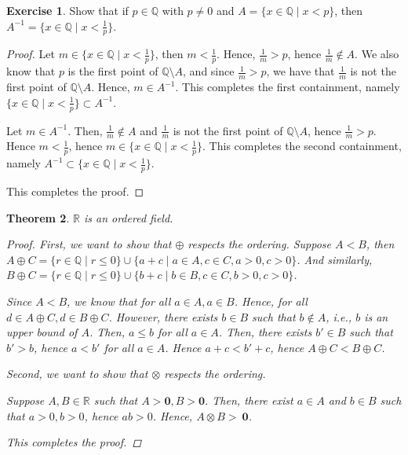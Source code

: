 \documentclass[11pt]{article}
\newcommand{\bbQ}{\mathbb{Q}}
\newcommand{\bbR}{\mathbb{R}}
\newtheorem{theorem}{Theorem}[section]
\theoremstyle{definition}
\newtheorem{exercise}[theorem]{Exercise}
\numberwithin{equation}{subsection}
\begin{document}
\begin{exercise}
	Show that if $p \in \bbQ$ with $p \neq 0$ and $A= \{x \in \bbQ \mid x < p\}$, then $A^{-1} = \{x \in \bbQ \mid x < \frac{1}{p}\}$.
        
\begin{proof}
Let $m \in \{x \in \bbQ \mid x < \frac{1}{p}\}$, then $m<\frac{1}{p}$. Hence, $\frac{1}{m}>p$, hence $\frac{1}{m} \notin A$. We also know that $p$ is the first point of $\bbQ \setminus A$, and since $\frac{1}{m}>p$, we have that $\frac{1}{m}$ is not the first point of $\bbQ \setminus A$. Hence, $m \in A^{-1}$. This completes the first containment, namely $\{x \in \bbQ \mid x < \frac{1}{p}\} \subset A^{-1}$.

Let $m \in A^{-1}$. Then, $\frac{1}{m} \notin A$ and $\frac{1}{m}$ is not the first point of $\bbQ \setminus A$, hence $\frac{1}{m}>p$. Hence $m<\frac{1}{p}$, hence $m \in \{x \in \bbQ \mid x < \frac{1}{p}\}$. This completes the second containment, namely $A^{-1} \subset \{x \in \bbQ \mid x < \frac{1}{p}\}$.

This completes the proof.

\renewcommand\qedsymbol{QED}
\end{proof}

\end{exercise}

\begin{theorem}
	$\bbR$ is an ordered field. 
        
\begin{proof}
First, we want to show that $\oplus$ respects the ordering. Suppose $A<B$, then $A\oplus C = \{r\in \bbQ \mid r\leq 0\} \cup \{a+c \mid a\in A, c\in C, a>0, c>0\}$. And similarly, $B\oplus C = \{r\in \bbQ \mid r\leq 0\} \cup \{b+c \mid b\in B, c\in C, b>0,c>0\}$. 

Since $A<B$, we know that for all $a \in A, a\in B$. Hence, for all $d \in A\oplus C, d \in B \oplus C$. However, there exists $b \in B$ such that $b \notin A$, i.e., $b$ is an upper bound of $A$. Then, $a\leq b$ for all $a \in A$. Then, there exists $b' \in B$ such that $b'>b$, hence $a< b'$ for all $a\in A$. Hence $a+c<b'+c$, hence $A\oplus C < B \oplus C$.

Second, we want to show that $\otimes$ respects the ordering.

Suppose $A,B \in \bbR$ such that $A>\mathbf{0},B>\mathbf{0}$. Then, there exist $a\in A$ and $b\in B$ such that $a>0,b>0$, hence $ab>0$. Hence, $A \otimes B >\ \mathbf{0}$.

This completes the proof.

\renewcommand\qedsymbol{QED}
\end{proof}

\end{theorem}
\newpage
\end{document}
